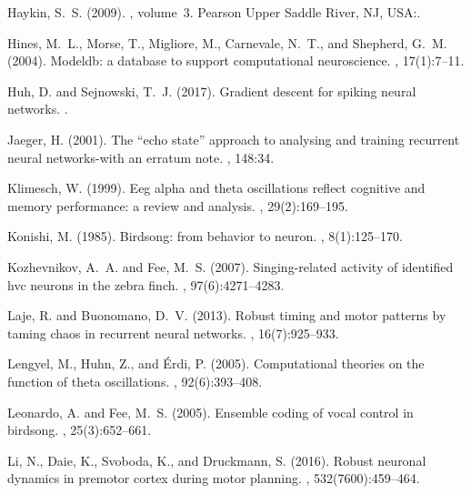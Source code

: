 \documentclass[11pt]{article} %
\begin{document}
\begin{thebibliography}{10}
Haykin, S.~S. (2009).
, volume~3.
\newblock Pearson Upper Saddle River, NJ, USA:.

Hines, M.~L., Morse, T., Migliore, M., Carnevale, N.~T., and Shepherd, G.~M.
  (2004).
\newblock Modeldb: a database to support computational neuroscience.
, 17(1):7--11.

Huh, D. and Sejnowski, T.~J. (2017).
\newblock Gradient descent for spiking neural networks.
.

Jaeger, H. (2001).
\newblock The “echo state” approach to analysing and training recurrent
  neural networks-with an erratum note.
, 148:34.

Klimesch, W. (1999).
\newblock Eeg alpha and theta oscillations reflect cognitive and memory
  performance: a review and analysis.
, 29(2):169--195.

Konishi, M. (1985).
\newblock Birdsong: from behavior to neuron.
, 8(1):125--170.

Kozhevnikov, A.~A. and Fee, M.~S. (2007).
\newblock Singing-related activity of identified hvc neurons in the zebra
  finch.
, 97(6):4271--4283.

Laje, R. and Buonomano, D.~V. (2013).
\newblock Robust timing and motor patterns by taming chaos in recurrent neural
  networks.
, 16(7):925--933.

Lengyel, M., Huhn, Z., and {\'E}rdi, P. (2005).
\newblock Computational theories on the function of theta oscillations.
, 92(6):393--408.

Leonardo, A. and Fee, M.~S. (2005).
\newblock Ensemble coding of vocal control in birdsong.
, 25(3):652--661.

Li, N., Daie, K., Svoboda, K., and Druckmann, S. (2016).
\newblock Robust neuronal dynamics in premotor cortex during motor planning.
, 532(7600):459--464.


\end{thebibliography}
\end{document}
